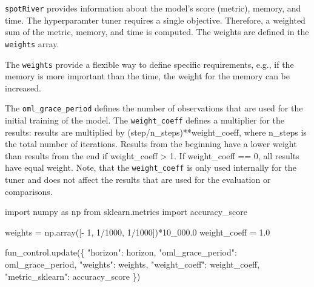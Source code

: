 \documentclass[
  letterpaper,
  DIV=11,
  numbers=noendperiod]{scrreprt}
\newenvironment{Shaded}{\begin{snugshade}}{\end{snugshade}}
\newcommand{\DecValTok}[1]{\textcolor[rgb]{0.68,0.00,0.00}{#1}}
\newcommand{\FloatTok}[1]{\textcolor[rgb]{0.68,0.00,0.00}{#1}}
\newcommand{\ImportTok}[1]{\textcolor[rgb]{0.00,0.46,0.62}{#1}}
\newcommand{\NormalTok}[1]{\textcolor[rgb]{0.00,0.23,0.31}{#1}}
\newcommand{\OperatorTok}[1]{\textcolor[rgb]{0.37,0.37,0.37}{#1}}
\newcommand{\StringTok}[1]{\textcolor[rgb]{0.13,0.47,0.30}{#1}}
\begin{document}
\texttt{spotRiver} provides information about the model's score
(metric), memory, and time. The hyperparamter tuner requires a single
objective. Therefore, a weighted sum of the metric, memory, and time is
computed. The weights are defined in the \texttt{weights} array.

\begin{tcolorbox}[enhanced jigsaw, rightrule=.15mm, opacityback=0, colframe=quarto-callout-note-color-frame, opacitybacktitle=0.6, toptitle=1mm, arc=.35mm, colbacktitle=quarto-callout-note-color!10!white, coltitle=black, toprule=.15mm, leftrule=.75mm, titlerule=0mm, title=\textcolor{quarto-callout-note-color}{\faInfo}\hspace{0.5em}{Note: Weights}, bottomrule=.15mm, breakable, bottomtitle=1mm, left=2mm, colback=white]

The \texttt{weights} provide a flexible way to define specific
requirements, e.g., if the memory is more important than the time, the
weight for the memory can be increased.

\end{tcolorbox}

The \texttt{oml\_grace\_period} defines the number of observations that
are used for the initial training of the model. The
\texttt{weight\_coeff} defines a multiplier for the results: results are
multiplied by (step/n\_steps)**weight\_coeff, where n\_steps is the
total number of iterations. Results from the beginning have a lower
weight than results from the end if weight\_coeff \textgreater{} 1. If
weight\_coeff == 0, all results have equal weight. Note, that the
\texttt{weight\_coeff} is only used internally for the tuner and does
not affect the results that are used for the evaluation or comparisons.

\begin{Shaded}
\begin{Highlighting}[]
\ImportTok{import}\NormalTok{ numpy }\ImportTok{as}\NormalTok{ np}
\ImportTok{from}\NormalTok{ sklearn.metrics }\ImportTok{import}\NormalTok{ accuracy\_score}

\NormalTok{weights }\OperatorTok{=}\NormalTok{ np.array([}\OperatorTok{{-}} \DecValTok{1}\NormalTok{, }\DecValTok{1}\OperatorTok{/}\DecValTok{1000}\NormalTok{, }\DecValTok{1}\OperatorTok{/}\DecValTok{1000}\NormalTok{])}\OperatorTok{*}\FloatTok{10\_000.0}
\NormalTok{weight\_coeff }\OperatorTok{=} \FloatTok{1.0}

\NormalTok{fun\_control.update(\{}
               \StringTok{"horizon"}\NormalTok{: horizon,}
               \StringTok{"oml\_grace\_period"}\NormalTok{: oml\_grace\_period,}
               \StringTok{"weights"}\NormalTok{: weights,}
               \StringTok{"weight\_coeff"}\NormalTok{: weight\_coeff,}
               \StringTok{"metric\_sklearn"}\NormalTok{: accuracy\_score}
\NormalTok{               \})}
\end{Highlighting}
\end{Shaded}
\end{document}
